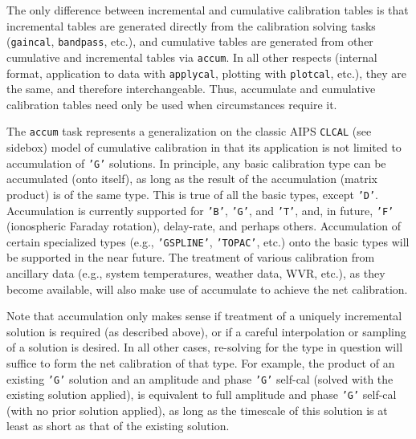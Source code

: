 The only difference between incremental and cumulative calibration
tables is that incremental tables are generated directly from the
calibration solving tasks ({\tt gaincal}, {\tt bandpass}, etc.), and
cumulative tables are generated from other cumulative and incremental
tables via {\tt accum}. In all other respects (internal format,
application to data with {\tt applycal}, plotting with {\tt plotcal},
etc.), they are the same, and therefore interchangeable. Thus,
accumulate and cumulative calibration tables need only be used when
circumstances require it.

The {\tt accum} task represents a generalization on the classic AIPS
{\tt CLCAL} (see sidebox) model of cumulative calibration in that its
application is not limited to accumulation of {\tt 'G'} solutions. 
In principle, any
basic calibration type can be accumulated (onto itself), as long as the
result of the accumulation (matrix product) is of the same type. This is
true of all the basic types, except {\tt 'D'}. Accumulation is currently
supported for {\tt 'B'}, {\tt 'G'}, and {\tt 'T'}, and, in future,
{\tt 'F'} (ionospheric Faraday rotation), delay-rate, and perhaps
others. Accumulation of certain specialized
types (e.g., {\tt 'GSPLINE'}, {\tt 'TOPAC'}, etc.) onto the basic types will be
supported in the near future. The treatment of various calibration from
ancillary data (e.g., system temperatures, weather data, WVR, etc.), as
they become available, will also make use of accumulate to achieve the net
calibration.

Note that accumulation only makes sense if treatment of a uniquely
incremental solution is required (as described above), or if a careful
interpolation or sampling of a solution is desired. In all other cases,
re-solving for the type in question will suffice to form the net
calibration of that type. For example, the product of an existing {\tt 'G'}
solution and an amplitude and phase {\tt 'G'} self-cal (solved with the
existing solution applied), is equivalent to full amplitude and phase
{\tt 'G'} self-cal (with no prior solution applied), as long as the timescale
of this solution is at least as short as that of the existing solution.

